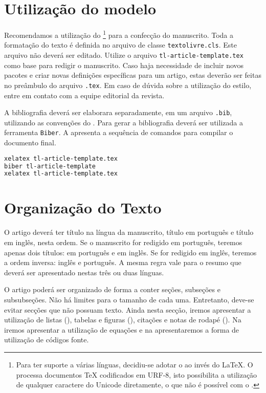 \documentclass[anonymous=true]{textolivre}
\begin{document}
\section{Utilização do modelo}\label{sec-modelo}
Recomendamos a utilização do \footnote{
Para ter suporte a várias línguas, decidiu-se adotar o  ao invés do \LaTeX{}.
O  processa documentos \TeX{} codificados em URF-8, isto possibilita 
a utilização de qualquer caractere do Unicode diretamente, o que não é possível com o .  
} para a confecção do manuscrito.
Toda a formatação do texto é definida no arquivo de classe \texttt{textolivre.cls}. 
Este arquivo não deverá ser editado. 
Utilize o arquivo \texttt{tl-article-template.tex} como base para redigir o manuscrito.
Caso haja necessidade de incluir novos pacotes e criar novas definições específicas para um artigo, 
estas deverão ser feitas no preâmbulo do arquivo \texttt{.tex}. 
Em caso de dúvida sobre a utilização do estilo, entre em contato com a equipe editorial da revista.

A bibliografia deverá ser elaborara separadamente, em um arquivo \texttt{.bib}, utilizando as 
convenções do . Para gerar a bibliografia deverá ser utilizada a ferramenta \texttt{Biber}.
A  apresenta a sequência de comandos para compilar o documento final.
\begin{lstlisting}[language=bash, label=lst-compiledocument, caption={Sequência para gerar o documento final.}]
xelatex tl-article-template.tex 
biber tl-article-template 
xelatex tl-article-template.tex
\end{lstlisting} %

\section{Organização do Texto}\label{sec-organizacao}
O artigo deverá ter título na língua da manuscrito, título em português e título em inglês, nesta ordem.
Se o manuscrito for redigido em português, teremos apenas dois títulos: em português e em inglês.
Se for redigido em inglês, teremos a ordem inversa: inglês e português.
A mesma regra vale para o resumo que deverá ser apresentado nestas três ou duas línguas.

O artigo poderá ser organizado de forma a conter seções, subseções e subsubseções. 
Não há limites para o tamanho de cada uma. Entretanto, deve-se evitar secções que não possuam texto. 
Ainda nesta secção, iremos apresentar a utilização de listas (), 
tabelas e figuras (), citações e notas de rodapé (). 
Na  iremos apresentar a utilização de equações e na 
apresentaremos a forma de utilização de códigos fonte.
\end{document}
